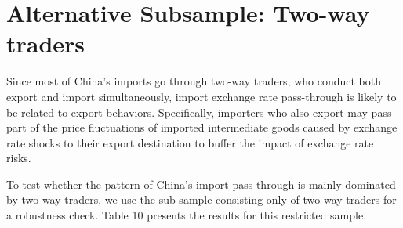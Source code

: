 \section{Alternative Subsample: Two-way traders}

Since most of China's imports go through two-way traders, who conduct both export and import simultaneously, import exchange rate pass-through is likely to be related to export behaviors. Specifically, importers who also export may pass part of the price fluctuations of imported intermediate goods caused by exchange rate shocks to their export destination to buffer the impact of exchange rate risks. 

To test whether the pattern of China's import pass-through is mainly dominated by two-way traders, we use the sub-sample consisting only of two-way traders for a robustness check. Table 10 presents the results for this restricted sample.

